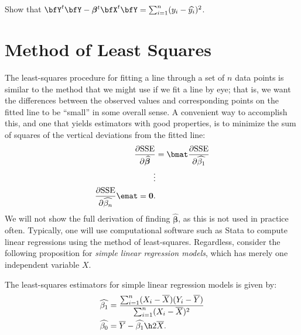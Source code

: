     \begin{exercise}
        Show that $\bfY^t \bfY - \boldsymbol{\beta}^t \bfX^t \bfY = \sum_{i = 1}^n (y_i - \widehat{y_i})^2$.
    \end{exercise}

\section{Method of Least Squares}
    The least-squares procedure for fitting a line through a set of $n$ data points is similar to the method that we might use if we fit a line by eye; that is, we want the differences between the observed values and corresponding points on the fitted line to be “small” in some overall sense. A convenient way to accomplish this, and one that yields estimators with good properties, is to minimize the sum of squares of the vertical deviations from the fitted line:
        \begin{equation*}
        \begin{split}
            \frac{\partial \text{SSE}}{\partial \widehat{\boldsymbol{\beta}}}
            & = \bmat \frac{\partial \text{SSE}}{\partial \widehat{\beta_1}} \\ \vdots \\ \frac{\partial \text{SSE}}{\partial \widehat{\beta_n}} \emat = \mathbf{0}.
        \end{split}
        \end{equation*}
    We will not show the full derivation of finding $\widehat{\boldsymbol{\beta}}$, as this is not used in practice often. Typically, one will use computational software such as Stata to compute linear regressions using the method of least-squares. Regardless, consider the following proposition for \textit{simple linear regression models}, which has merely one independent variable $X$.

    \begin{proposition}
        The least-squares estimators for simple linear regression models is given by:
            \begin{equation*}
            \begin{split}
                \widehat{\beta_1} &= \frac{\sum_{i = 1}^n (X_i - \overline{X})(Y_i - \overline{Y})}{\sum_{i = 1}^n (X_i - \overline{X})^2} \\
                \widehat{\beta_0} & = \overline{Y} - \widehat{\beta_1}\h2\overline{X}.
            \end{split}
            \end{equation*}
    \end{proposition}
    
